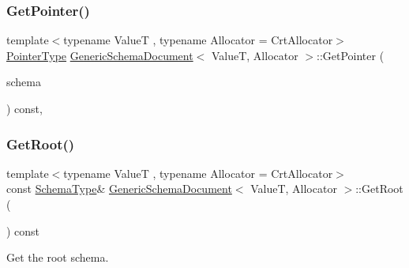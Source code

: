 \mbox{\label{classGenericSchemaDocument_ad359e04187039fe6e61b279383e7360e}} 
\subsubsection{\texorpdfstring{Get\+Pointer()}{GetPointer()}}
{\footnotesize\ttfamily template$<$typename ValueT , typename Allocator  = Crt\+Allocator$>$ \\
\hyperlink{classGenericSchemaDocument_aeb62f562d4dc024402b00f97cbcef747}{Pointer\+Type} \hyperlink{classGenericSchemaDocument}{Generic\+Schema\+Document}$<$ ValueT, Allocator $>$\+::Get\+Pointer (\begin{DoxyParamCaption}\item[{const \hyperlink{classGenericSchemaDocument_acaf115202b159a2eb72c97c3dc6c3895}{Schema\+Type} $\ast$}]{schema }\end{DoxyParamCaption}) const\hspace{0.3cm}{\ttfamily [inline]}, {\ttfamily [private]}}

\mbox{\label{classGenericSchemaDocument_a3b86ad6eab393014cc5b3c52da5c4bc2}} 
\subsubsection{\texorpdfstring{Get\+Root()}{GetRoot()}}
{\footnotesize\ttfamily template$<$typename ValueT , typename Allocator  = Crt\+Allocator$>$ \\
const \hyperlink{classGenericSchemaDocument_acaf115202b159a2eb72c97c3dc6c3895}{Schema\+Type}\& \hyperlink{classGenericSchemaDocument}{Generic\+Schema\+Document}$<$ ValueT, Allocator $>$\+::Get\+Root (\begin{DoxyParamCaption}{ }\end{DoxyParamCaption}) const\hspace{0.3cm}{\ttfamily [inline]}}



Get the root schema. 

\mbox{\label{classGenericSchemaDocument_a683d864da98a955e02aea2bf3035f463}} 
